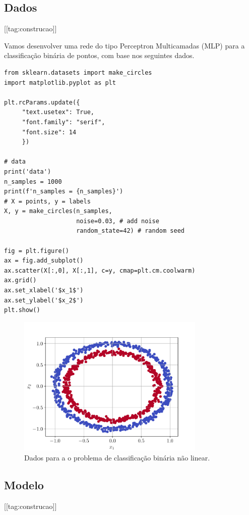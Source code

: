 \subsection{Dados}

[[tag:construcao]]

Vamos desenvolver uma rede do tipo Perceptron Multicamadas (MLP) para a classificação binária de pontos, com base nos seguintes dados.

\begin{lstlisting}
from sklearn.datasets import make_circles
import matplotlib.pyplot as plt

plt.rcParams.update({
     "text.usetex": True,
     "font.family": "serif",
     "font.size": 14
     })

# data
print('data')
n_samples = 1000
print(f'n_samples = {n_samples}')
# X = points, y = labels
X, y = make_circles(n_samples,
                    noise=0.03, # add noise
                    random_state=42) # random seed

fig = plt.figure()
ax = fig.add_subplot()
ax.scatter(X[:,0], X[:,1], c=y, cmap=plt.cm.coolwarm)
ax.grid()
ax.set_xlabel('$x_1$')
ax.set_ylabel('$x_2$')
plt.show()
\end{lstlisting}

\begin{figure}[H]
  \centering
  \includegraphics[width=0.8\textwidth]{./cap_mlp/dados/fig_classbin/fig}
  \caption{Dados para a o problema de classificação binária não linear.}
  \label{cap_mlp_sec_classbin:fig:dados}
\end{figure}

\subsection{Modelo}
[[tag:construcao]]

